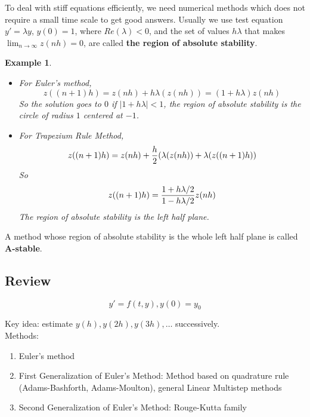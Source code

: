\documentclass[20pt]{article} %
\theoremstyle{break}
\newtheorem{exa}[definition]{Example}
\begin{document}
\newpage

To deal with stiff equations efficiently, we need numerical methods which does not require a small time scale to get good answers. Usually we use test equation $y'=\lambda y$, $y(0)=1$, where $Re(\lambda)<0$, and the set of values $h\lambda$ that makes $\lim_{n\rightarrow \infty}z(nh)=0$, are called {\bf the region of absolute stability}.

\begin{exa}
  \begin{itemize}
\item For Euler's method,
  \[z((n+1)h)=z(nh)+h\lambda(z(nh))=(1+h\lambda)z(nh)\]
  So the solution goes to $0$ if $|1+h\lambda|<1$, the region of absolute stability is the circle of radius $1$ centered at $-1$.
\item For Trapezium Rule Method,
  \[z((n+1)h)=z(nh)+{h\over 2}(\lambda(z(nh))+\lambda(z((n+1)h))\]
 So
  \[z((n+1)h)={1+h\lambda/2\over 1-h\lambda/2}z(nh)\]
  The region of absolute stability is the left half plane.
  \end{itemize}
\end{exa}

A method whose region of absolute stability is the whole left half plane is called {\bf A-stable}.


\newpage

\subsection{Review}

\[y'=f(t, y), y(0)=y_0\]

Key idea: estimate $y(h), y(2h), y(3h), \dots$ successively.\\

Methods:
\begin{enumerate}
\item Euler's method
\item First Generalization of Euler's Method: Method based on quadrature rule (Adams-Bashforth, Adams-Moulton), general Linear Multistep methods 
\item Second Generalization of Euler's Method: Rouge-Kutta family
\end{enumerate}

\newpage
\end{document}
